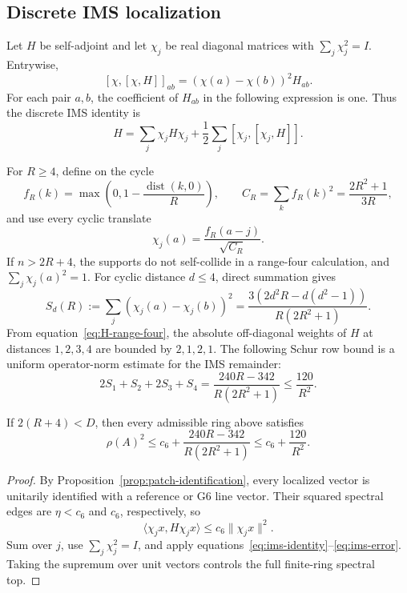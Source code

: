 \subsection{Discrete IMS localization}
\label{subsec:discrete-ims-localization}

Let \(H\) be self-adjoint and let \(\chi_j\) be real diagonal matrices with
\(\sum_j\chi_j^2=I\).  Entrywise,
\[
[\chi,[\chi,H]]_{ab}=(\chi(a)-\chi(b))^2H_{ab}.
\]
For each pair \(a,b\), the coefficient of \(H_{ab}\) in the following
expression is one. Thus the discrete IMS identity is
\begin{equation}\label{eq:ims-identity}
H=\sum_j\chi_jH\chi_j
+\frac12\sum_j[\chi_j,[\chi_j,H]].
\end{equation}

For \(R\geq4\), define on the cycle
\[
f_R(k)=\max\left(0,1-\frac{\operatorname{dist}(k,0)}R\right),
\qquad
C_R=\sum_kf_R(k)^2=\frac{2R^2+1}{3R},
\]
and use every cyclic translate
\[
\chi_j(a)=\frac{f_R(a-j)}{\sqrt{C_R}}.
\]
If \(n>2R+4\), the supports do not self-collide in a range-four
calculation, and \(\sum_j\chi_j(a)^2=1\).  For cyclic distance \(d\leq4\),
direct summation gives
\[
S_d(R):=\sum_j(\chi_j(a)-\chi_j(b))^2
=\frac{3(2d^2R-d(d^2-1))}{R(2R^2+1)}.
\]
From equation~\eqref{eq:H-range-four}, the absolute off-diagonal weights of
\(H\) at distances \(1,2,3,4\) are bounded by \(2,1,2,1\).  The following
Schur row bound is a uniform operator-norm estimate for the IMS remainder:
\begin{equation}\label{eq:ims-error}
2S_1+S_2+2S_3+S_4
=\frac{240R-342}{R(2R^2+1)}
\leq\frac{120}{R^2}.
\end{equation}

\begin{proposition}\label{prop:ims-cap}
If \(2(R+4)<D\), then every admissible ring above satisfies
\[
\rho(A)^2
\leq c_6+\frac{240R-342}{R(2R^2+1)}
\leq c_6+\frac{120}{R^2}.
\]
\end{proposition}

\begin{proof}
By Proposition~\ref{prop:patch-identification}, every localized vector is
unitarily identified with a reference or G6 line vector.  Their squared
spectral edges are \(\eta<c_6\) and \(c_6\), respectively, so
\[
\langle\chi_jx,H\chi_jx\rangle
\leq c_6\|\chi_jx\|^2.
\]
Sum over \(j\), use \(\sum_j\chi_j^2=I\), and apply
equations~\eqref{eq:ims-identity}--\eqref{eq:ims-error}.  Taking the
supremum over unit vectors controls the full finite-ring spectral top.
\end{proof}

